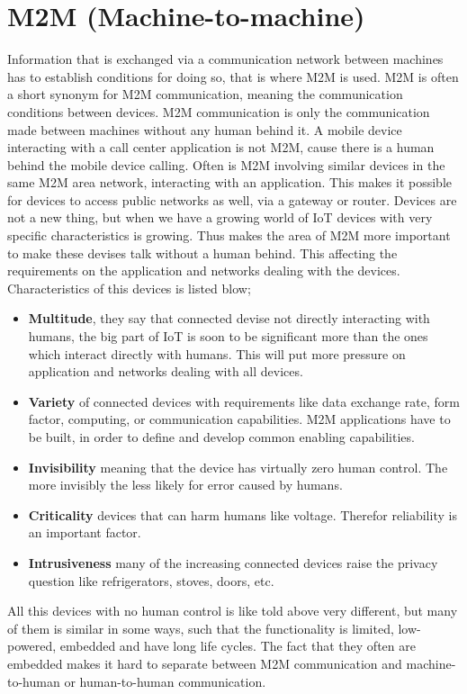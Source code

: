 \section{M2M (Machine-to-machine)}\label{sec:m2mauth}
Information that is exchanged via a communication network between machines has to establish conditions for doing so, that is where M2M is used. M2M is often a short synonym for M2M communication, meaning the communication conditions between devices. M2M communication is only the communication made between machines without any human behind it. A mobile device interacting with a call center application is not M2M, cause there is a human behind the mobile device calling. Often is M2M involving similar devices  in the same M2M area network, interacting with an application. This makes it possible for devices to access public networks as well, via a gateway or router.
Devices are not a new thing, but when we have a growing world of IoT devices with very specific characteristics is growing. Thus makes the area of M2M more important to make these devises talk without a human behind. This affecting the requirements on the application and networks dealing with the devices. Characteristics of this devices is listed blow;
\begin{itemize}
	\item[] \textbf{Multitude}, they say that connected devise not directly interacting with humans, the big part of IoT is soon to be significant more than the ones which interact directly with humans. This will put more pressure on application and networks dealing with all devices.
	\item[] \textbf{Variety} of connected devices with requirements like data exchange rate, form factor, computing, or communication capabilities. M2M applications have to be built, in order to define and develop common enabling capabilities.
	\item[] \textbf{Invisibility} meaning that the device has virtually zero human control. The more invisibly the less likely for error caused by humans. 
	\item[] \textbf{Criticality} devices that can harm humans like voltage. Therefor reliability is an important factor. 
	\item[] \textbf{Intrusiveness} many of the increasing connected devices raise the privacy question like refrigerators, stoves, doors, etc.
\end{itemize}
All this devices with no human control is like told above very different, but many of them is similar in some ways, such that the functionality is limited, low-powered, embedded and have long life cycles. The fact that they often are embedded makes it hard to separate between M2M communication and machine-to-human or human-to-human communication.
\cite[p.~2-4]{m2mComm}

